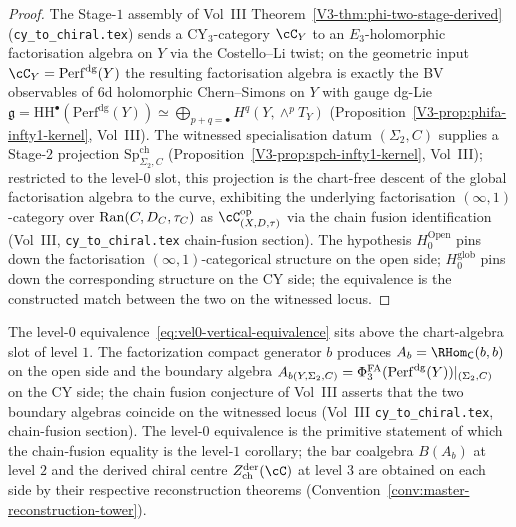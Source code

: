 \begin{proof}
The Stage-$1$ assembly of Vol~III Theorem~\ref{V3-thm:phi-two-stage-derived}
\textup{(}\texttt{cy\_to\_chiral.tex}\textup{)}
sends a CY$_3$-category $\cC_Y$ to an $E_3$-holomorphic factorisation
algebra on $Y$ via the Costello--Li twist; on the geometric input
$\cC_Y = \mathrm{Perf}^{\mathrm{dg}}(Y)$ the resulting factorisation
algebra is exactly the BV observables of 6d holomorphic Chern--Simons
on $Y$ with gauge dg-Lie $\mathfrak g = \mathrm{HH}^\bullet(\mathrm{Perf}^{\mathrm{dg}}(Y))
\simeq \bigoplus_{p+q=\bullet} H^q(Y, \wedge^p T_Y)$
(Proposition~\ref{V3-prop:phifa-infty1-kernel}, Vol~III).
The witnessed specialisation datum $(\Sigma_2, C)$ supplies a Stage-$2$
projection $\mathrm{Sp}^{\mathrm{ch}}_{\Sigma_2, C}$
\textup{(}Proposition~\ref{V3-prop:spch-infty1-kernel}, Vol~III\textup{);}
restricted to the level-$0$ slot, this projection is the chart-free
descent of the global factorisation algebra to the curve, exhibiting
the underlying factorisation $(\infty, 1)$-category over
$\mathrm{Ran}(C, D_C, \tau_C)$ as $\cC^{\op}_{(X, D, \tau)}$ via the chain
fusion identification
\textup{(}Vol~III, \texttt{cy\_to\_chiral.tex} chain-fusion section\textup{).}
The hypothesis $H_0^{\mathrm{Open}}$ pins down the factorisation
$(\infty, 1)$-categorical structure on the open side; $H_0^{\mathrm{glob}}$
pins down the corresponding structure on the CY side; the equivalence
is the constructed match between the two on the witnessed locus.
\end{proof}

\begin{remark}
\label{rem:vel0-phi-fa-compat}
The level-$0$ equivalence~\eqref{eq:vel0-vertical-equivalence} sits
above the chart-algebra slot of level $1$.  The factorization compact
generator $b$ produces $A_b=\RHom_{\mathsf C}(b,b)$ on the open side
and the boundary algebra
$A_{b(Y, \Sigma_2, C)} = \Phi^{\mathrm{FA}}_3(\mathrm{Perf}^{\mathrm{dg}}(Y))|_{(\Sigma_2, C)}$
on the CY side; the chain fusion conjecture of Vol~III asserts that
the two boundary algebras coincide on the witnessed locus
\textup{(}Vol~III \texttt{cy\_to\_chiral.tex}, chain-fusion section\textup{).} The
level-$0$ equivalence is the primitive statement of which the
chain-fusion equality is the level-$1$ corollary; the bar coalgebra
$B(A_b)$ at level $2$ and the derived chiral centre
$Z^{\mathrm{der}}_{\mathrm{ch}}(\cC)$ at level $3$ are obtained on
each side by their respective reconstruction theorems
(Convention~\ref{conv:master-reconstruction-tower}).
\end{remark}


